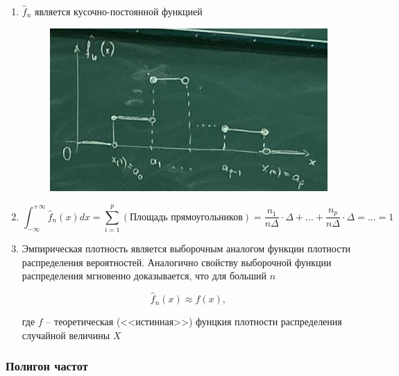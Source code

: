 \begin{note}
    \begin{enumerate}
        \item $\hat f_n$ является кусочно-постоянной функцией

            \begin{figure}[H]
                \centering
                \includegraphics[scale=0.8]{img/hystogramm.jpg}
            \end{figure}

        \item
            \begin{equation*}
                \int_{-\infty}^{+\infty} \hat f_n(x) dx =
                \sum_{i=1}^p (\text{Площадь прямоугольников}) =
                \frac{n_1}{n\Delta} \cdot \Delta + ... +
                \frac{n_p}{n\Delta} \cdot \Delta = ... = 1
            \end{equation*}

        \item Эмпирическая плотность является выборочным аналогом
            функции плотности распределения вероятностей.
            Аналогично свойству выборочной функции распределения
            мгновенно доказывается, что для больший $n$

            \begin{equation*}
                \hat f_n(x) \approx f(x),
            \end{equation*}

            где $f$ -- теоретическая (<<истинная>>) фунцкия плотности
            распределения случайной величины $X$
    \end{enumerate}
\end{note}

\subsubsection{Полигон частот}

